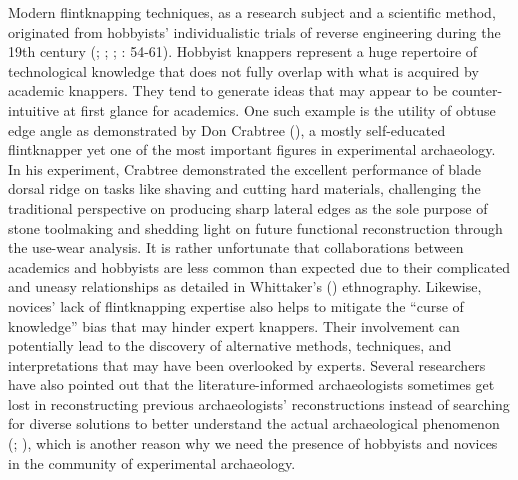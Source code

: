 \documentclass[
  11pt,
  letterpaper,
  DIV=11,
  numbers=noendperiod]{scrartcl}
\begin{document}
Modern flintknapping techniques, as a research subject and a scientific
method, originated from hobbyists' individualistic trials of reverse
engineering during the 19th century (; ;
;
: 54-61). Hobbyist knappers
represent a huge repertoire of technological knowledge that does not
fully overlap with what is acquired by academic knappers. They tend to
generate ideas that may appear to be counter-intuitive at first glance
for academics. One such example is the utility of obtuse edge angle as
demonstrated by Don Crabtree (), a
mostly self-educated flintknapper yet one of the most important figures
in experimental archaeology. In his experiment, Crabtree demonstrated
the excellent performance of blade dorsal ridge on tasks like shaving
and cutting hard materials, challenging the traditional perspective on
producing sharp lateral edges as the sole purpose of stone toolmaking
and shedding light on future functional reconstruction through the
use-wear analysis. It is rather unfortunate that collaborations between
academics and hobbyists are less common than expected due to their
complicated and uneasy relationships as detailed in Whittaker's
() ethnography. Likewise, novices'
lack of flintknapping expertise also helps to mitigate the ``curse of
knowledge'' bias that may hinder expert knappers. Their involvement can
potentially lead to the discovery of alternative methods, techniques,
and interpretations that may have been overlooked by experts. Several
researchers have also pointed out that the literature-informed
archaeologists sometimes get lost in reconstructing previous
archaeologists' reconstructions instead of searching for diverse
solutions to better understand the actual archaeological phenomenon
(; ), which is another reason why we need the presence of hobbyists
and novices in the community of experimental archaeology.
\end{document}
